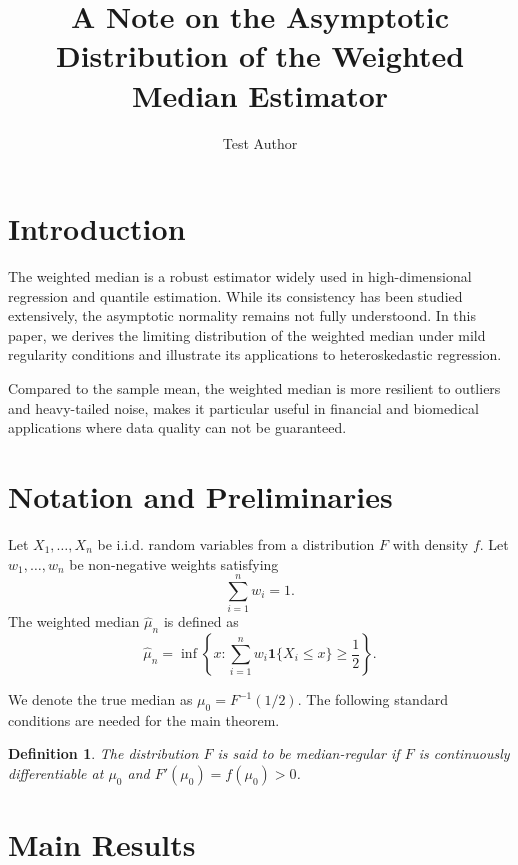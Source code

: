 \documentclass[12pt]{article}
\title{A Note on the Asymptotic Distribution of the Weighted Median Estimator}
\author{Test Author}
\date{}
\newtheorem{definition}{Definition}
\begin{document}
\maketitle

\section{Introduction}

The weighted median is a robust estimator widely used in high-dimensional regression and quantile estimation. While its consistency has been studied extensively, the asymptotic normality remains not fully understoond. In this paper, we derives the limiting distribution of the weighted median under mild regularity conditions and illustrate its applications to heteroskedastic regression.

Compared to the sample mean, the weighted median is more resilient to outliers and heavy-tailed noise, makes it particular useful in financial and biomedical applications where data quality can not be guaranteed.

\section{Notation and Preliminaries}

Let $X_1, \ldots, X_n$ be i.i.d. random variables from a distribution $F$ with density $f$. Let $w_1, \ldots, w_n$ be non-negative weights satisfying
\begin{equation}
    \sum_{i=1}^n w_i = 1.
\end{equation}
The weighted median $\hat{\mu}_n$ is defined as
\begin{equation}
    \hat{\mu}_n = \inf\left\{ x : \sum_{i=1}^n w_i \mathbf{1}\{X_i \leq x\} \geq \frac{1}{2} \right\}.
\end{equation}

We denote the true median as $\mu_0 = F^{-1}(1/2)$. The following standard conditions are needed for the main theorem.

\begin{definition}
The distribution $F$ is said to be \textit{median-regular} if $F$ is continuously differentiable at $\mu_0$ and $F'(\mu_0) = f(\mu_0) > 0$.
\end{definition}

\section{Main Results}
\end{document}
